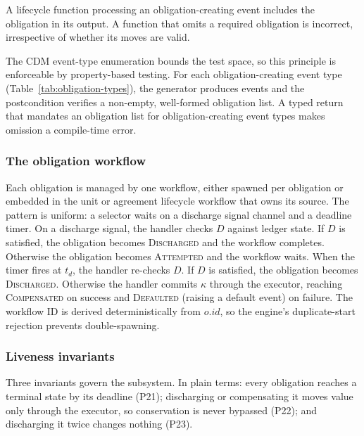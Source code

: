 \begin{principle}
\label{princ:obligation-completeness}
A lifecycle function processing an obligation-creating event includes the obligation in its output. A function that omits a required obligation is incorrect, irrespective of whether its moves are valid.
\end{principle}

\noindent The CDM event-type enumeration bounds the test space, so this principle is enforceable by property-based testing. For each obligation-creating event type (Table~\ref{tab:obligation-types}), the generator produces events and the postcondition verifies a non-empty, well-formed obligation list. A typed return that mandates an obligation list for obligation-creating event types makes omission a compile-time error.

\subsubsection{The obligation workflow}
\label{sec:obligation-workflow}

Each obligation is managed by one workflow, either spawned per obligation or embedded in the unit or agreement lifecycle workflow that owns its source. The pattern is uniform: a selector waits on a discharge signal channel and a deadline timer. On a discharge signal, the handler checks $D$ against ledger state. If $D$ is satisfied, the obligation becomes \textsc{Discharged} and the workflow completes. Otherwise the obligation becomes \textsc{Attempted} and the workflow waits. When the timer fires at $t_d$, the handler re-checks $D$. If $D$ is satisfied, the obligation becomes \textsc{Discharged}. Otherwise the handler commits $\kappa$ through the executor, reaching \textsc{Compensated} on success and \textsc{Defaulted} (raising a default event) on failure. The workflow ID is derived deterministically from $o.\mathit{id}$, so the engine's duplicate-start rejection prevents double-spawning.

\subsubsection{Liveness invariants}
\label{sec:obligation-invariants}

Three invariants govern the subsystem. In plain terms: every obligation reaches a terminal state by its deadline (P21); discharging or compensating it moves value only through the executor, so conservation is never bypassed (P22); and discharging it twice changes nothing (P23).

